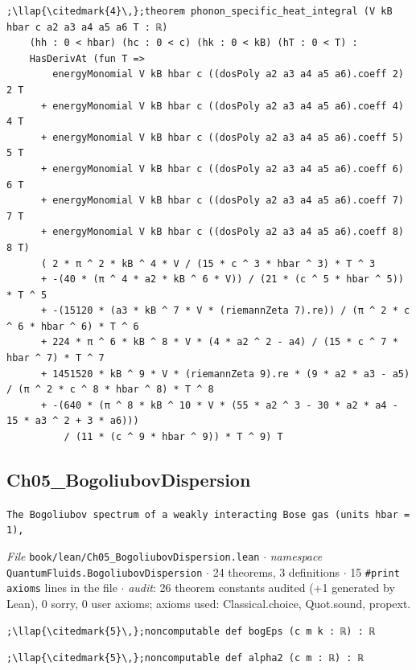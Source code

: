 \begin{lstlisting}[style=leancat]
;\llap{\citedmark{4}\,};theorem phonon_specific_heat_integral (V kB hbar c a2 a3 a4 a5 a6 T : ℝ)
    (hh : 0 < hbar) (hc : 0 < c) (hk : 0 < kB) (hT : 0 < T) :
    HasDerivAt (fun T =>
        energyMonomial V kB hbar c ((dosPoly a2 a3 a4 a5 a6).coeff 2) 2 T
      + energyMonomial V kB hbar c ((dosPoly a2 a3 a4 a5 a6).coeff 4) 4 T
      + energyMonomial V kB hbar c ((dosPoly a2 a3 a4 a5 a6).coeff 5) 5 T
      + energyMonomial V kB hbar c ((dosPoly a2 a3 a4 a5 a6).coeff 6) 6 T
      + energyMonomial V kB hbar c ((dosPoly a2 a3 a4 a5 a6).coeff 7) 7 T
      + energyMonomial V kB hbar c ((dosPoly a2 a3 a4 a5 a6).coeff 8) 8 T)
      ( 2 * π ^ 2 * kB ^ 4 * V / (15 * c ^ 3 * hbar ^ 3) * T ^ 3
      + -(40 * (π ^ 4 * a2 * kB ^ 6 * V)) / (21 * (c ^ 5 * hbar ^ 5)) * T ^ 5
      + -(15120 * (a3 * kB ^ 7 * V * (riemannZeta 7).re)) / (π ^ 2 * c ^ 6 * hbar ^ 6) * T ^ 6
      + 224 * π ^ 6 * kB ^ 8 * V * (4 * a2 ^ 2 - a4) / (15 * c ^ 7 * hbar ^ 7) * T ^ 7
      + 1451520 * kB ^ 9 * V * (riemannZeta 9).re * (9 * a2 * a3 - a5) / (π ^ 2 * c ^ 8 * hbar ^ 8) * T ^ 8
      + -(640 * (π ^ 8 * kB ^ 10 * V * (55 * a2 ^ 3 - 30 * a2 * a4 - 15 * a3 ^ 2 + 3 * a6)))
          / (11 * (c ^ 9 * hbar ^ 9)) * T ^ 9) T
\end{lstlisting}

\subsection{Ch05\_\allowbreak{}BogoliubovDispersion}
{\footnotesize\raggedright\texttt{The Bogoliubov spectrum of a weakly interacting Bose gas (units hbar = 1),\allowbreak{}}\par}
{\footnotesize\raggedright\emph{File} \texttt{book/lean/Ch05\_\allowbreak{}BogoliubovDispersion.\allowbreak{}lean} $\cdot$ \emph{namespace} \texttt{QuantumFluids.\allowbreak{}BogoliubovDispersion} $\cdot$ 24 theorems, 3 definitions $\cdot$ 15 \texttt{\#print axioms} lines in the file $\cdot$ \emph{audit}: 26 theorem constants audited (+1 generated by Lean), 0 sorry, 0 user axioms; axioms used: Classical.choice, Quot.sound, propext.\par}
\begin{lstlisting}[style=leancat]
;\llap{\citedmark{5}\,};noncomputable def bogEps (c m k : ℝ) : ℝ
\end{lstlisting}

\begin{lstlisting}[style=leancat]
;\llap{\citedmark{5}\,};noncomputable def alpha2 (c m : ℝ) : ℝ
\end{lstlisting}

